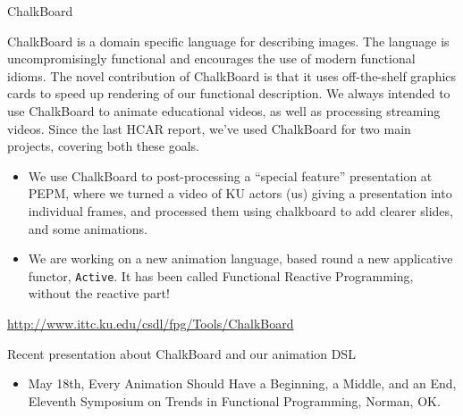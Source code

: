\documentclass{article}
\begin{document}
\begin{hcarentry}{ChalkBoard}
\makeheader

ChalkBoard is a domain specific language for describing images. 
The language is uncompromisingly functional
and encourages the use of modern functional idioms.
The novel contribution of ChalkBoard is that it uses off-the-shelf
graphics cards to speed up rendering of our functional description.
We always intended to use ChalkBoard to animate educational
videos, as well as processing streaming videos.
Since the last HCAR report, we've used ChalkBoard for two main projects,
covering both these goals.
\begin{itemize}
\item We use ChalkBoard to post-processing a
``special feature'' presentation at PEPM, where we turned
a video of KU actors (us) giving a presentation into individual frames,
and processed them using chalkboard to add clearer slides, and some animations.
\item We are working on a new animation language, based round a new applicative
functor, \verb|Active|. It has been called Functional Reactive Programming,
without the reactive part!
\end{itemize}

\FurtherReading
  \url{http://www.ittc.ku.edu/csdl/fpg/Tools/ChalkBoard}

Recent presentation about ChalkBoard and our animation DSL
\begin{itemize}
\item May 18th, Every Animation Should Have a Beginning, a Middle, and an End, Eleventh Symposium on Trends in Functional Programming, Norman, OK.
\end{itemize}

\end{hcarentry}
\end{document}
